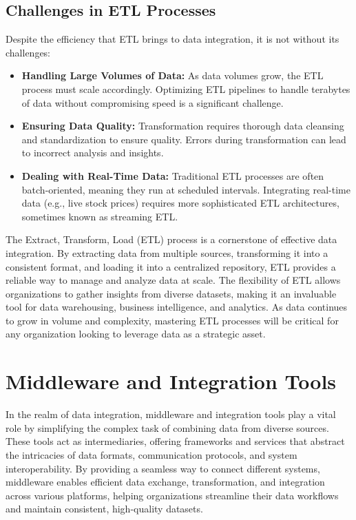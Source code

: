 \documentclass[12pt]{article}
\begin{document}
\subsection{Challenges in ETL Processes}
Despite the efficiency that ETL brings to data integration, it is not without its challenges:
\begin{itemize}
    \item \textbf{Handling Large Volumes of Data:} As data volumes grow, the ETL process must scale accordingly. Optimizing ETL pipelines to handle terabytes of data without compromising speed is a significant challenge.
    \item \textbf{Ensuring Data Quality:} Transformation requires thorough data cleansing and standardization to ensure quality. Errors during transformation can lead to incorrect analysis and insights.
    \item \textbf{Dealing with Real-Time Data:} Traditional ETL processes are often batch-oriented, meaning they run at scheduled intervals. Integrating real-time data (e.g., live stock prices) requires more sophisticated ETL architectures, sometimes known as streaming ETL.
\end{itemize}

The Extract, Transform, Load (ETL) process is a cornerstone of effective data integration. By extracting data from multiple sources, transforming it into a consistent format, and loading it into a centralized repository, ETL provides a reliable way to manage and analyze data at scale. The flexibility of ETL allows organizations to gather insights from diverse datasets, making it an invaluable tool for data warehousing, business intelligence, and analytics. As data continues to grow in volume and complexity, mastering ETL processes will be critical for any organization looking to leverage data as a strategic asset.

\section{Middleware and Integration Tools}
In the realm of data integration, middleware and integration tools play a vital role by simplifying the complex task of combining data from diverse sources. These tools act as intermediaries, offering frameworks and services that abstract the intricacies of data formats, communication protocols, and system interoperability. By providing a seamless way to connect different systems, middleware enables efficient data exchange, transformation, and integration across various platforms, helping organizations streamline their data workflows and maintain consistent, high-quality datasets.
\end{document}
